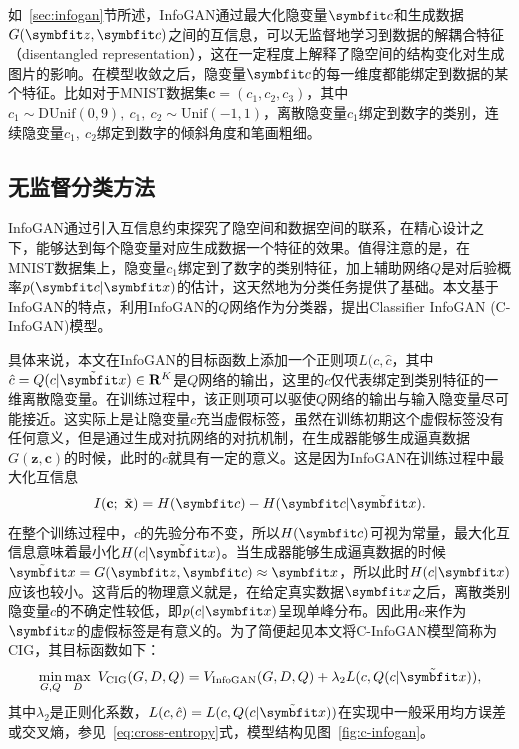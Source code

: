 如~\ref{sec:infogan}节所述，InfoGAN通过最大化隐变量$\bd{c}$和生成数据$G(\bd{z}, \bd{c})$之间的互信息，可以无监督地学习到数据的解耦合特征（disentangled representation），这在一定程度上解释了隐空间的结构变化对生成图片的影响。在模型收敛之后，隐变量$\bd{c}$的每一维度都能绑定到数据的某个特征。比如对于MNIST数据集$\mathbf{c} = (c_1, c_2, c_3)$，其中$c_1 \sim \text{DUnif}(0,9), ~c_1,~c_2 \sim \text{Unif}(-1,1)$，离散隐变量$c_1$绑定到数字的类别，连续隐变量$c_1, ~c_2$绑定到数字的倾斜角度和笔画粗细。

\subsection{无监督分类方法}
InfoGAN通过引入互信息约束探究了隐空间和数据空间的联系，在精心设计之下，能够达到每个隐变量对应生成数据一个特征的效果。值得注意的是，在MNIST数据集上，隐变量$c_1$绑定到了数字的类别特征，加上辅助网络$Q$是对后验概率$p(\bd{c}|\bd{x})$的估计，这天然地为分类任务提供了基础。本文基于InfoGAN的特点，利用InfoGAN的$Q$网络作为分类器，提出Classifier InfoGAN (C-InfoGAN)模型。

具体来说，本文在InfoGAN的目标函数上添加一个正则项$L(c,\hat{c}$，其中$\hat{c} = Q(c|\tilde{\bd{x}}) \in \reals^K$是$Q$网络的输出，这里的$c$仅代表绑定到类别特征的一维离散隐变量。在训练过程中，该正则项可以驱使$Q$网络的输出与输入隐变量尽可能接近。这实际上是让隐变量$c$充当虚假标签，虽然在训练初期这个虚假标签没有任何意义，但是通过生成对抗网络的对抗机制，在生成器能够生成逼真数据$G(\mathbf{z}, \mathbf{c})$的时候，此时的$c$就具有一定的意义。这是因为InfoGAN在训练过程中最大化互信息
\[
  I(\mathbf{c};~\tilde{\mathbf{x}}) = 
    H(\bd{c}) - H(\bd{c}|\tilde{\bd{x}}).
\]
在整个训练过程中，$c$的先验分布不变，所以$H(\bd{c})$可视为常量，最大化互信息意味着最小化$H(c|\tilde{\bd{x}})$。当生成器能够生成逼真数据的时候$\tilde{\bd{x}} = G(\bd{z},\bd{c}) \approx \bd{x}$，所以此时$H(c|\bd{x})$应该也较小。这背后的物理意义就是，在给定真实数据$\bd{x}$之后，离散类别隐变量$c$的不确定性较低，即$p(c|\bd{x})$呈现单峰分布。因此用$c$来作为$\bd{x}$的虚假标签是有意义的。为了简便起见本文将C-InfoGAN模型简称为CIG，其目标函数如下：
\begin{equation}
    \min_{G,Q}\max_D~ V_{\text{CIG}}(G,D,Q) = 
    V_{\text{InfoGAN}}(G,D,Q) + \lambda_2 L(c, Q(c|\tilde{\bd{x}})),
\end{equation}
其中$\lambda_2$是正则化系数，$L(c,\hat{c}) = L(c, Q(c|\tilde{\bd{x}}))$在实现中一般采用均方误差或交叉熵，参见~\eqref{eq:cross-entropy}式，模型结构见图~\ref{fig:c-infogan}。

